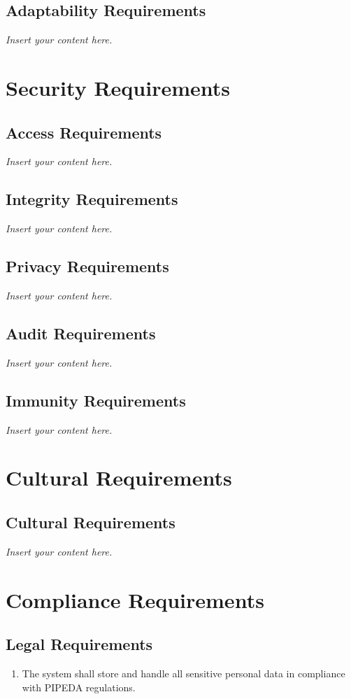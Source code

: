 \documentclass[12pt]{article}
\newcommand{\lips}{\textit{Insert your content here.}}
\begin{document}
\subsection{Adaptability Requirements}
\lips

\section{Security Requirements}
\subsection{Access Requirements}
\lips
\subsection{Integrity Requirements}
\lips
\subsection{Privacy Requirements}
\lips
\subsection{Audit Requirements}
\lips
\subsection{Immunity Requirements}
\lips

\section{Cultural Requirements}
\subsection{Cultural Requirements}
\lips

\section{Compliance Requirements}
\subsection{Legal Requirements}
\begin{enumerate}[align=left,
  leftmargin=*,
  labelsep=1em,
  itemindent=0em,
  label=\bfseries LG-\arabic*:]
  \item The system shall store and handle all sensitive personal data in compliance with
    PIPEDA regulations.
\end{enumerate}
\end{document}
